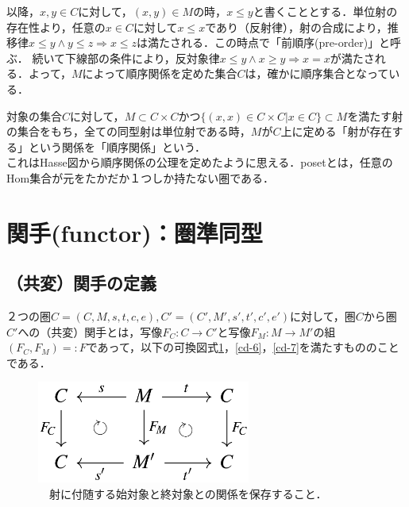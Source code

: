 \documentclass[uplatex, 12pt, a4paper, dvipdfmx]{jsarticle}
\begin{document}
以降，$x,y\in C$に対して，$(x,y)\in M$の時，$x\le y$と書くこととする．単位射の存在性より，任意の$x\in C$に対して$x\le x$であり（反射律），射の合成により，推移律$x\le y \wedge y\le z \Longrightarrow x\le z$は満たされる．この時点で「前順序(pre-order)」と呼ぶ．
続いて下線部の条件により，反対象律$x\le y \wedge x\ge y \Longrightarrow x=x$が満たされる．よって，$M$によって順序関係を定めた集合$C$は，確かに順序集合となっている．

\begin{screen}
    対象の集合$C$に対して，$M\subset C\times C$かつ$\{ (x,x) \in C\times C | x\in C \}\subset M$を満たす射の集合をもち，全ての同型射は単位射である時，$M$が$C$上に定める「射が存在する」という関係を「順序関係」という．\\
    これはHasse図から順序関係の公理を定めたように思える．posetとは，任意のHom集合が元をたかだか１つしか持たない圏である．
\end{screen}

\clearpage
\section{関手(functor)：圏準同型}

\subsection{（共変）関手の定義}

\begin{shadebox}\begin{definition}[（共変）関手]
    ２つの圏$C=(C,M,s,t,c,e),C'=(C',M',s',t',c',e')$に対して，圏$C$から圏$C'$への（共変）関手とは，写像$F_C:C\longrightarrow C'$と写像$F_M:M\longrightarrow M'$の組$(F_C,F_M)=:F$であって，以下の可換図式\ref{cd-5}，\ref{cd-6}，\ref{cd-7}を満たすもののことである．
\end{definition}\end{shadebox}

\begin{figure}[ht]\begin{center} \caption{\label{cd-5}　射に付随する始対象と終対象との関係を保存すること．}
    \includegraphics[width=7cm]{cd-5.png}
\end{center}\end{figure}
\end{document}
